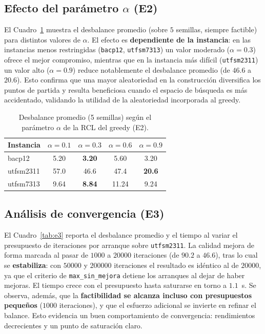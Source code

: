 \documentclass[letter, 10pt]{article}
\begin{document}
\subsection{Efecto del par\'ametro $\alpha$ (E2)}
El Cuadro~\ref{tab:e2} muestra el desbalance promedio (sobre $5$ semillas, siempre factible) para distintos valores de $\alpha$. El efecto es \textbf{dependiente de la instancia}: en las instancias menos restringidas (\texttt{bacp12}, \texttt{utfsm7313}) un valor moderado ($\alpha=0.3$) ofrece el mejor compromiso, mientras que en la instancia m\'as dif\'icil (\texttt{utfsm2311}) un valor alto ($\alpha=0.9$) reduce notablemente el desbalance promedio (de $46.6$ a $20.6$). Esto confirma que una mayor aleatoriedad en la construcci\'on diversifica los puntos de partida y resulta beneficiosa cuando el espacio de b\'usqueda es m\'as accidentado, validando la utilidad de la aleatoriedad incorporada al greedy.

\begin{table}[h]
\centering
\begin{tabular}{lcccc}
\hline
Instancia & $\alpha=0.1$ & $\alpha=0.3$ & $\alpha=0.6$ & $\alpha=0.9$ \\
\hline
bacp12    & 5.20 & \textbf{3.20} & 5.60 & 3.20 \\
utfsm2311 & 57.0 & 46.6 & 47.4 & \textbf{20.6} \\
utfsm7313 & 9.64 & \textbf{8.84} & 11.24 & 9.24 \\
\hline
\end{tabular}
\caption{Desbalance promedio (5 semillas) seg\'un el par\'ametro $\alpha$ de la RCL del greedy (E2).}
\label{tab:e2}
\end{table}

\subsection{An\'alisis de convergencia (E3)}
El Cuadro~\ref{tab:e3} reporta el desbalance promedio y el tiempo al variar el presupuesto de iteraciones por arranque sobre \texttt{utfsm2311}. La calidad mejora de forma marcada al pasar de $1000$ a $20000$ iteraciones (de $90.2$ a $46.6$), tras lo cual se \textbf{estabiliza}: con $50000$ y $200000$ iteraciones el resultado es id\'entico al de $20000$, ya que el criterio de \texttt{max\_sin\_mejora} detiene los arranques al dejar de haber mejoras. El tiempo crece con el presupuesto hasta saturarse en torno a $1.1$~s. Se observa, adem\'as, que la \textbf{factibilidad se alcanza incluso con presupuestos peque\~nos} ($1000$ iteraciones), y que el esfuerzo adicional se invierte en refinar el balance. Esto evidencia un buen comportamiento de convergencia: rendimientos decrecientes y un punto de saturaci\'on claro.
\end{document}
